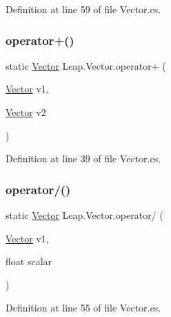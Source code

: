 Definition at line 59 of file Vector.\+cs.

\mbox{\label{struct_leap_1_1_vector_af056d6d462839c1e5d3d9fa7d0507f11}} 
\subsubsection{\texorpdfstring{operator+()}{operator+()}}
{\footnotesize\ttfamily static \mbox{\hyperlink{struct_leap_1_1_vector}{Vector}} Leap.\+Vector.\+operator+ (\begin{DoxyParamCaption}\item[{\mbox{\hyperlink{struct_leap_1_1_vector}{Vector}}}]{v1,  }\item[{\mbox{\hyperlink{struct_leap_1_1_vector}{Vector}}}]{v2 }\end{DoxyParamCaption})\hspace{0.3cm}{\ttfamily [static]}}



Definition at line 39 of file Vector.\+cs.

\mbox{\label{struct_leap_1_1_vector_a8a707fa512d65682a773f87308c6d0e9}} 
\subsubsection{\texorpdfstring{operator/()}{operator/()}}
{\footnotesize\ttfamily static \mbox{\hyperlink{struct_leap_1_1_vector}{Vector}} Leap.\+Vector.\+operator/ (\begin{DoxyParamCaption}\item[{\mbox{\hyperlink{struct_leap_1_1_vector}{Vector}}}]{v1,  }\item[{float}]{scalar }\end{DoxyParamCaption})\hspace{0.3cm}{\ttfamily [static]}}



Definition at line 55 of file Vector.\+cs.

\mbox{\label{struct_leap_1_1_vector_ae3811a09e999d99576d40d361d5871fd}} 
